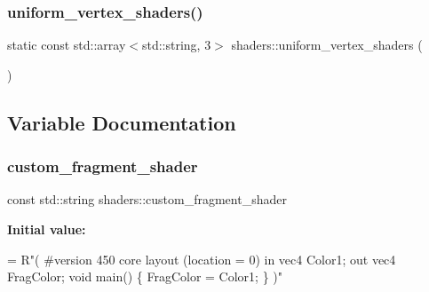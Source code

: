 \mbox{\label{namespaceshaders_a14e65ed0b380c99c27347214aa2f1844}} 
\subsubsection{\texorpdfstring{uniform\+\_\+vertex\+\_\+shaders()}{uniform\_vertex\_shaders()}}
{\footnotesize\ttfamily static const std\+::array$<$std\+::string, 3$>$ shaders\+::uniform\+\_\+vertex\+\_\+shaders (\begin{DoxyParamCaption}\item[{\{ R\char`\"{}(\#version 450 corelayout (location = 0) in vec2 a\+Pos;uniform mat4 transform;void \mbox{\hyperlink{gtest__tests_8cpp_a3c04138a5bfe5d72780bb7e82a18e627}{main}}()\{gl\+\_\+\+Point\+Size=30.\+0f;gl\+\_\+\+Position = transform$\ast$vec4(a\+Pos, 1.\+0f,1.\+0f);\})\char`\"{}, R\char`\"{}(\#version 450 corelayout (location = 0) in vec3 a\+Pos;uniform mat4 transform;void main()\{gl\+\_\+\+Point\+Size=30.\+0f;gl\+\_\+\+Position = transform$\ast$vec4(a\+Pos,1.\+0f);\})\char`\"{}, R\char`\"{}(\#version 450 corelayout (location = 0) in vec4 a\+Pos;uniform mat4 transform;void main()\{gl\+\_\+\+Point\+Size=10.\+0f;gl\+\_\+\+Position = transform$\ast$a\+Pos;\})\char`\"{} \}}]{ }\end{DoxyParamCaption})\hspace{0.3cm}{\ttfamily [static]}}



\subsection{Variable Documentation}
\mbox{\label{namespaceshaders_acea5f97c6eee2604b26ca2c01a42018b}} 
\subsubsection{\texorpdfstring{custom\+\_\+fragment\+\_\+shader}{custom\_fragment\_shader}}
{\footnotesize\ttfamily const std\+::string shaders\+::custom\+\_\+fragment\+\_\+shader\hspace{0.3cm}{\ttfamily [static]}}

{\bfseries Initial value\+:}
\begin{DoxyCode}
= R\textcolor{stringliteral}{"(}
\textcolor{stringliteral}{#version 450 core}
\textcolor{stringliteral}{}
\textcolor{stringliteral}{layout (location = 0) in  vec4 Color1;}
\textcolor{stringliteral}{}
\textcolor{stringliteral}{out vec4 FragColor;}
\textcolor{stringliteral}{}
\textcolor{stringliteral}{void main()}
\textcolor{stringliteral}{\{}
\textcolor{stringliteral}{FragColor = Color1;}
\textcolor{stringliteral}{\}}
\textcolor{stringliteral}{)"}
\end{DoxyCode}
